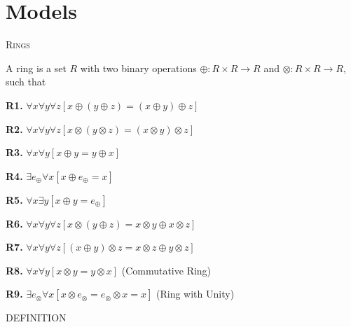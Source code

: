 \documentclass[12pt, a4paper]{article}
\begin{document}
\section{Models}

\vspace{4mm}

\noindent\large{\textsc{Rings}}\normalsize

\vspace{4mm}

\noindent A ring is a set $R$ with two binary operations $\oplus\colon R\times R\rightarrow R$ and $\otimes\colon R\times R\rightarrow R$, such that\par

\begin{description}

\item\textbf{R1.} $\forall x\forall y\forall z[x\oplus(y\oplus z)=(x\oplus y)\oplus z]$

\item\textbf{R2.} $\forall x\forall y\forall z[x\otimes(y\otimes z)=(x\otimes y)\otimes z]$

\item\textbf{R3.} $\forall x\forall y[x\oplus y=y\oplus x]$

\item\textbf{R4.} $\exists e_{\oplus}\forall x[x\oplus e_{\oplus}=x]$

\item\textbf{R5.} $\forall x\exists y[x\oplus y=e_{\oplus}]$

\item\textbf{R6.} $\forall x\forall y\forall z[x\otimes(y\oplus z)=x\otimes y\oplus x\otimes z]$

\item\textbf{R7.} $\forall x\forall y\forall z[(x\oplus y)\otimes z=x\otimes z\oplus y\otimes z]$

\item*\textbf{R8.} $\forall x\forall y[x\otimes y=y\otimes x]$ (Commutative Ring)

\item*\textbf{R9.} $\exists e_{\otimes}\forall x[x\otimes e_{\otimes}=e_{\otimes}\otimes x=x]$ (Ring with Unity)

\end{description}

\vspace{4mm}

\noindent\blacksquare\rm\hspace{2mm} DEFINITION\par
\end{document}

